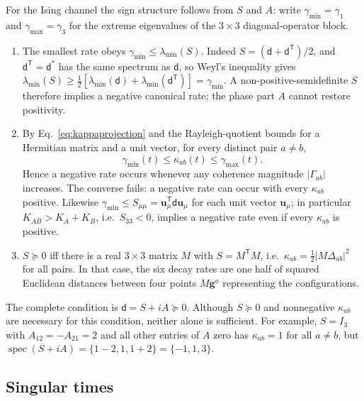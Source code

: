 \documentclass[11pt,a4paper]{article}
\newcommand{\spec}{\operatorname{spec}}
\newcommand{\dmat}{\mathsf d}
\begin{document}
For the Ising channel the sign structure follows from $S$ and $A$:
write $\gamma_{\min}=\gamma_1$ and $\gamma_{\max}=\gamma_3$ for the
extreme eigenvalues of the $3\times3$ diagonal-operator block.
\begin{enumerate}
\item The smallest rate obeys $\gamma_{\min}\le\lambda_{\min}(S)$.
Indeed $S=(\dmat+\dmat^{\mathsf T})/2$, and $\dmat^{\mathsf T}=\dmat^*$
has the same spectrum as $\dmat$, so Weyl's inequality gives
$\lambda_{\min}(S)\ge\frac12[\lambda_{\min}(\dmat)+\lambda_{\min}(\dmat^{\mathsf T})]
=\gamma_{\min}$. A non-positive-semidefinite $S$
therefore implies a negative canonical rate; the phase part $A$ cannot
restore positivity.
\item By Eq.~\eqref{eq:kappaprojection} and the Rayleigh-quotient bounds
for a Hermitian matrix and a unit vector, for every distinct pair $a\ne b$,
\begin{equation}
 \gamma_{\min}(t)\le\kappa_{ab}(t)\le\gamma_{\max}(t).
 \label{eq:ratebounds}
\end{equation}
Hence a negative rate occurs whenever any coherence magnitude
$\lvert\Gamma_{ab}\rvert$ increases. The converse fails: a negative rate
can occur with every $\kappa_{ab}$ positive. Likewise
$\gamma_{\min}\le S_{\mu\mu}=\mathbf u_\mu^{\mathsf T}\dmat\mathbf u_\mu$ for each
unit vector $\mathbf u_\mu$; in particular $K_{AB}>K_A+K_B$, i.e.\
$S_{33}<0$, implies a negative rate even if every $\kappa_{ab}$ is
positive.
\item $S\succeq0$ iff there is a real $3\times3$ matrix $M$ with
$S=M^{\mathsf T}M$, i.e.\
$\kappa_{ab}=\frac12\lvert M\Delta_{ab}\rvert^2$ for all pairs.
In that case, the six decay rates are one half of squared Euclidean
distances between four points $M\mathbf g^a$ representing the
configurations.
\end{enumerate}

The complete condition is $\dmat=S+iA\succeq0$. Although
$S\succeq0$ and nonnegative $\kappa_{ab}$ are necessary for this
condition, neither alone is sufficient. For example,
$S=I_3$ with $A_{12}=-A_{21}=2$ and all other entries of $A$ zero
has $\kappa_{ab}=1$ for all $a\ne b$, but
$\spec(S+iA)=\{1-2,1,1+2\}=\{-1,1,3\}$.

\subsection{Singular times}
\end{document}

